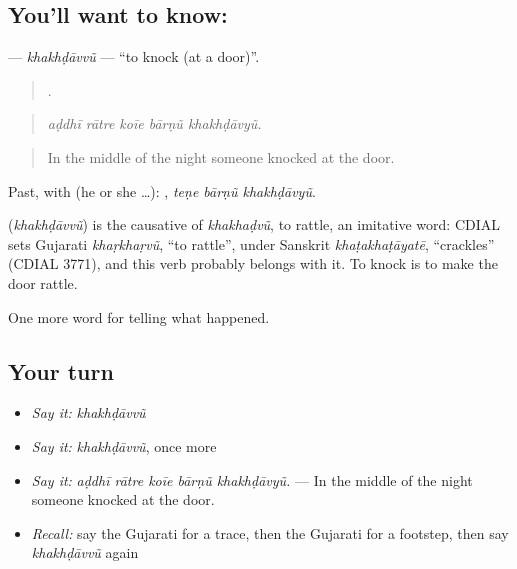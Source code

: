 \subsection*{You'll want to know: }
\textbf{} — \emph{khakhḍāvvũ} — \textquotedblleft{}to knock (at a door)\textquotedblright{}.

\begin{quote}
    .
\end{quote}

\begin{quote}
\emph{aḍdhī rātre koīe bārṇũ khakhḍāvyũ.}
\end{quote}

\begin{quote}
In the middle of the night someone knocked at the door.
\end{quote}

Past, with  (he or she …):   , \emph{teṇe bārṇũ khakhḍāvyũ}.

\begin{cousinweb}
\textbf{} (\emph{khakhḍāvvũ}) is the causative of \emph{khakhaḍvũ}, to rattle, an imitative word: CDIAL sets Gujarati \emph{khaṛkhaṛvũ}, \textquotedblleft{}to rattle\textquotedblright{}, under Sanskrit \emph{khaṭakhaṭāyatē}, \textquotedblleft{}crackles\textquotedblright{} (CDIAL 3771), and this verb probably belongs with it. To knock is to make the door rattle.
\end{cousinweb}

\begin{grammarlens}[title={What you've built}]
One more word for telling what happened.
\end{grammarlens}

\subsection*{Your turn}
\begin{itemize}
\raggedright
  \item \emph{Say it:} \emph{khakhḍāvvũ}
  \item \emph{Say it:} \emph{khakhḍāvvũ}, once more
  \item \emph{Say it:} \emph{aḍdhī rātre koīe bārṇũ khakhḍāvyũ.} — In the middle of the night someone knocked at the door.
  \item \emph{Recall:} say the Gujarati for a trace, then the Gujarati for a footstep, then say \emph{khakhḍāvvũ} again
\end{itemize}


